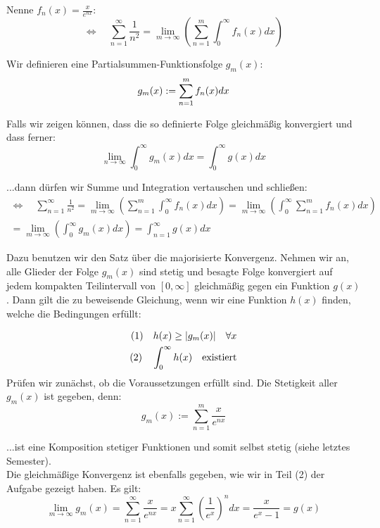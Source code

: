 \documentclass[a4paper,german,12pt,smallheadings]{scrartcl}
\begin{document}
Nenne $f_n(x)=\frac{x}{e^{nx}}:$
\begin{equation*}
\Leftrightarrow \quad \sum_{n=1}^{\infty}\frac{1}{n^2}=\lim\limits_{m \to \infty}\left(\sum_{n=1}^{m}\int_{0}^{\infty}f_n(x)dx\right)
\end{equation*}

Wir definieren eine Partialsummen-Funktionsfolge $g_m(x)$:
\begin{equation*}
g_m(x):=\sum_{n=1}^{m}f_n(x)dx\\
\end{equation*}

Falls wir zeigen können, dass die so definierte Folge gleichmäßig konvergiert und dass ferner:
\begin{equation*}
\lim\limits_{n \to \infty}\int_{0}^{\infty}g_m(x)dx=\int_{0}^{\infty}g(x)dx
\end{equation*}

...dann dürfen wir Summe und Integration vertauschen und schließen:
\begin{align*}
\Leftrightarrow \quad \sum_{n=1}^{\infty}\frac{1}{n^2}=\lim\limits_{m \to \infty}\left(\sum_{n=1}^{m}\int_{0}^{\infty}f_n(x)dx\right)=\lim\limits_{m \to \infty}\left(\int_{0}^{\infty}\sum_{n=1}^{m}f_n(x)dx\right)\\
=\lim\limits_{m \to \infty}\left(\int_{0}^{\infty}g_m(x)dx\right)=\int_{n=1}^{\infty}g(x)dx
\end{align*}

Dazu benutzen wir den Satz über die majorisierte Konvergenz. Nehmen wir an, alle Glieder der Folge $g_m(x)$ sind stetig und besagte Folge konvergiert auf jedem kompakten Teilintervall von $[0,\infty]$ gleichmäßig gegen ein Funktion $g(x)$. Dann gilt die zu beweisende Gleichung, wenn wir eine Funktion $h(x)$ finden, welche die Bedingungen erfüllt:

\begin{align*}
(1)\quad h(x)\geq |g_m(x)| \quad \forall x\\
(2)\quad \int_{0}^{\infty}h(x) \text \quad \text{existiert}
\end{align*}
Prüfen wir zunächst, ob die Voraussetzungen erfüllt sind. Die Stetigkeit aller $g_m(x)$ ist gegeben, denn:
\begin{equation*}
g_m(x):=\sum_{n=1}^{m}\frac{x}{e^{nx}}
\end{equation*}

...ist eine Komposition stetiger Funktionen und somit selbst stetig (siehe letztes Semester).\\
Die gleichmäßige Konvergenz ist ebenfalls gegeben, wie wir in Teil (2) der Aufgabe gezeigt haben. Es gilt:
\begin{equation*}
\lim\limits_{m \to \infty} g_m(x)=\sum_{n=1}^{\infty}\frac{x}{e^{nx}}=x\sum_{n=1}^{\infty}\left(\frac{1}{e^x}\right)^ndx=\frac{x}{e^x-1}=g(x)
\end{equation*}
\end{document}
